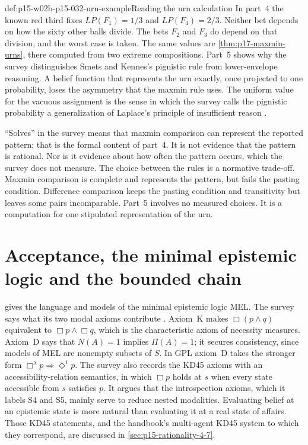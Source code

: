 \begin{hbexample}{def:p15-w02b-p15-032-urn-example}{Reading the urn calculation}
In part~4 the known red third fixes \(LP(F_1)=1/3\) and \(LP(F_4)=2/3\).
Neither bet depends on how the sixty other balls divide. The bets \(F_2\)
and \(F_3\) do depend on that division, and the worst case is taken. The
same values are \cref{thm:p17-maxmin-urns}, there computed from two extreme
compositions. Part~5 shows why the survey distinguishes Smets and Kennes's
pignistic rule from lower-envelope reasoning. A belief function that
represents the urn exactly, once projected to one probability, loses the
asymmetry that the maxmin rule uses. The uniform value for the vacuous
assignment is the sense in which the survey calls the pignistic
probability a generalization of Laplace's principle of insufficient reason
\cite[p.~312]{DuboisPrade2021RepresentingBelief}.
\end{hbexample}

``Solves'' in the survey means that maxmin comparison can represent the
reported pattern; that is the formal content of part~4. It is not
evidence that the pattern is rational. Nor is it evidence about how often
the pattern occurs, which the survey does not measure. The choice between
the rules is a normative trade-off. Maxmin comparison is complete and
represents the pattern, but fails the pasting condition. Difference
comparison keeps the pasting condition and transitivity but leaves some
pairs incomparable. Part~5 involves no measured choices. It is a
computation for one stipulated representation of the urn.

\section{Acceptance, the minimal epistemic logic and the bounded chain}
\label{sec:p15-w02b-p15-032-mel}

 gives the language and models of the minimal
epistemic logic MEL. The survey says what its two modal axioms contribute
\cite[p.~309]{DuboisPrade2021RepresentingBelief}. Axiom~K makes
\(\Box(p\land q)\) equivalent to \(\Box p\land\Box q\), which is the
characteristic axiom of necessity measures. Axiom~D says that \(N(A)=1\)
implies \(\Pi(A)=1\); it secures consistency, since models of MEL are
nonempty subsets of \(S\). In GPL axiom~D takes the stronger form
\(\Box^\lambda p\Rightarrow\Diamond^1p\). The survey also records the KD45
axioms with an accessibility-relation semantics, in which \(\Box p\) holds at
\(s\) when every state accessible from \(s\) satisfies \(p\). It argues that
the introspection axioms, which it labels S4 and S5, mainly serve to reduce
nested modalities.
Evaluating belief at an epistemic state is more natural than evaluating it
at a real state of affairs. Those KD45 statements, and the
handbook's multi-agent KD45 system to which they correspond, are discussed
in \cref{sec:p15-rationality-4-7}.

